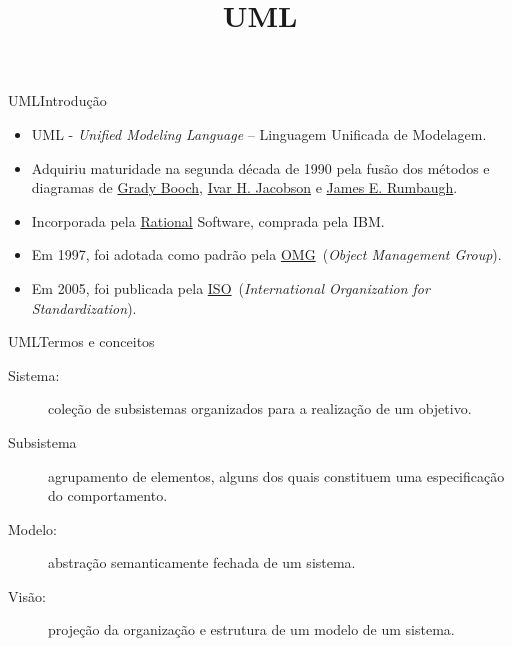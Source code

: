 
\title{UML}


\begin{frame}{UML}{Introdução}
  
  \begin{itemize}
  \item UML - {\it Unified Modeling Language} -- Linguagem Unificada
    de Modelagem.\pause
  \item Adquiriu maturidade na segunda década de 1990 pela fusão dos
    métodos e diagramas de
    \href{https://en.wikipedia.org/wiki/Grady_Booch}{Grady Booch}, 
    \href{https://en.wikipedia.org/wiki/Ivar_Jacobson}{Ivar H. Jacobson} e
    \href{https://en.wikipedia.org/wiki/James_Rumbaugh}{James E. Rumbaugh}.\pause
  \item Incorporada pela \href{http://www.ibm.com/software/rational}{Rational} 
    Software, comprada pela IBM.\pause
  \item Em 1997, foi adotada como padrão pela
    \href{http://www.omg.org/}{OMG}~({\it Object Management Group}).\pause
  \item Em 2005, foi publicada pela
    \href{http://www.iso.org/iso/home.html}{ISO}~({\it International
      Organization for Standardization}).
  \end{itemize}

\end{frame}

\begin{frame}{UML}{Termos e conceitos}
  \begin{description}
  \item[Sistema:] coleção de subsistemas organizados para a realização
    de um objetivo.\pause
  \item[Subsistema] agrupamento de elementos, alguns dos quais
    constituem uma especificação do comportamento.\pause
  \item[Modelo:] abstração semanticamente fechada de um sistema.\pause
  \item[Visão:] projeção da organização e estrutura de um modelo de um
    sistema.
  \end{description}

\end{frame}

